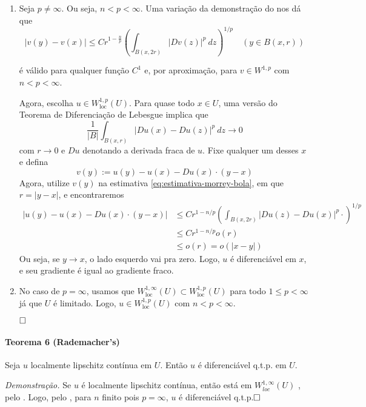 \documentclass[a4paper, 11pt]{book}
\newcommand{\qed}{$\hfill\square$}
\begin{document}
\begin{enumerate}
	\item Seja $p\neq \infty$. Ou seja, $n<p<\infty$. Uma variação da demonstração do  nos dá que \begin{equation}\label{eq:estimativa-morrey-bola}
		|v(y) - v(x)| \leq Cr^{1-\frac{n}{p}} \left(\int_{B(x,2r)} |Dv(z)|^p\ dz\right)^{1/p} \quad (y \in B(x,r))
	\end{equation}
	
	é válido para qualquer função $C^1$ e, por aproximação, para $v \in W^{1,p}$ com $n<p<\infty$.

	Agora, escolha $u \in W^{1,p}_{\text{loc}}(U)$. Para quase todo $x \in U$, uma versão do Teorema de Diferenciação de Lebesgue implica que \[
	\frac{1}{|B|}\int_{B(x,r)} |Du(x) -Du(z)|^p\ dz \rightarrow 0  	
	\] com $r\rightarrow 0$ e $Du$ denotando a derivada fraca de $u$. Fixe qualquer um desses $x$ e defina \[
	v(y):= u(y) - u(x) - Du(x)\cdot (y-x)
	\]
	Agora, utilize $v(y)$ na estimativa \eqref{eq:estimativa-morrey-bola}, em que $r=|y-x|$, e encontraremos \begin{align*}
		|u(y) - u(x) - Du(x)\cdot (y-x)| &\leq Cr^{1-n/p} \left( \int_{B(x,2r)} |Du(z) - Du(x)|^p  \cdot  \right)^{1/p} \\
		&\leq C r^{1-n/p} o(r) \\
		&\leq o(r) = o(|x-y|)
	\end{align*}
	Ou seja, se $y\rightarrow x$, o lado esquerdo vai pra zero.
	Logo, $u$ é diferenciável em $x$, e seu gradiente é igual ao gradiente fraco.

	\item No caso de $p=\infty$, usamos que $W^{1,\infty}_{\text{loc}}(U) \subset W^{1,p}_{\text{loc}}(U)$ para todo $1\leq p <\infty$ já que $U$ é limitado. Logo, $u \in W^{1,p}_{\text{loc}}(U)$ com $n<p<\infty$.
	
	\qed

\end{enumerate}

\paragraph{Teorema 6 (Rademacher's)} Seja $u$ localmente lipschitz contínua em $U$. Então $u$ é diferenciável q.t.p. em $U$.

\textit{Demonstração.} Se $u$ é localmente lipschitz contínua, então está em $W^{1,\infty}_{loc}(U)$ , pelo . Logo, pelo , para $n$ finito pois $p=\infty$, $u$ é diferenciável q.t.p.\qed
 
\end{document}
